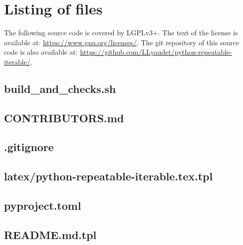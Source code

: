 \documentclass{article}
\begin{document}
\section{Listing of files}
\label{section:listing}

The following source code is covered by LGPLv3+.
The text of the license is available at:
\url{https://www.gnu.org/licenses/}.
The git repository of this source code is also available at:
\url{https://github.com/LLyaudet/python-repeatable-iterable/}.


\subsection{
  build\_and\_checks.sh
}
\label{
  build_and_checkssh
}



\subsection{
  CONTRIBUTORS.md
}
\label{
  CONTRIBUTORSmd
}



\subsection{
  .gitignore
}
\label{
  gitignore
}



\subsection{
  latex/python-repeatable-iterable.tex.tpl
}
\label{
  latex:python-repeatable-iterabletextpl
}



\subsection{
  pyproject.toml
}
\label{
  pyprojecttoml
}



\subsection{
  README.md.tpl
}
\label{
  READMEmdtpl
}
\end{document}
